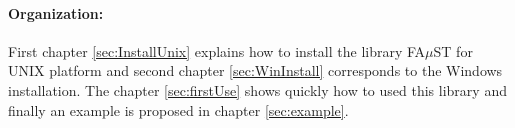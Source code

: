 \paragraph{Organization:}First chapter \ref{sec:InstallUnix} explains how to install the library FA$\mu$ST for UNIX platform and second chapter \ref{sec:WinInstall} corresponds to the Windows installation. The chapter \ref{sec:firstUse} shows quickly how to used this library and finally an example is proposed in chapter \ref{sec:example}. 